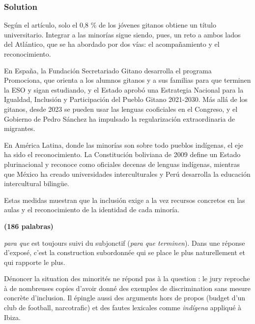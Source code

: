 \documentclass[11pt,a4paper]{article}
\begin{document}
\hypertarget{solution-10}{%
\subsubsection{Solution}\label{solution-10}}

Según el artículo, solo el 0,8 \% de los jóvenes gitanos obtiene un título universitario. Integrar a las minorías sigue siendo, pues, un reto a ambos lados del Atlántico, que se ha abordado por dos vías: el acompañamiento y el reconocimiento.

En España, la Fundación Secretariado Gitano desarrolla el programa Promociona, que orienta a los alumnos gitanos y a sus familias para que terminen la ESO y sigan estudiando, y el Estado aprobó una Estrategia Nacional para la Igualdad, Inclusión y Participación del Pueblo Gitano 2021-2030. Más allá de los gitanos, desde 2023 se pueden usar las lenguas cooficiales en el Congreso, y el Gobierno de Pedro Sánchez ha impulsado la regularización extraordinaria de migrantes.

En América Latina, donde las minorías son sobre todo pueblos indígenas, el eje ha sido el reconocimiento. La Constitución boliviana de 2009 define un Estado plurinacional y reconoce como oficiales decenas de lenguas indígenas, mientras que México ha creado universidades interculturales y Perú desarrolla la educación intercultural bilingüe.

Estas medidas muestran que la inclusión exige a la vez recursos concretos en las aulas y el reconocimiento de la identidad de cada minoría.

\textbf{(186 palabras)}

\begin{methode}

\emph{para que} est toujours suivi du subjonctif (\emph{para que terminen}). Dans une réponse d'exposé, c'est la construction subordonnée qui se place le plus naturellement et qui rapporte le plus.

\end{methode}

\begin{piege}

Dénoncer la situation des minorités ne répond pas à la question : le jury reproche à de nombreuses copies d'avoir donné des exemples de discrimination sans mesure concrète d'inclusion. Il épingle aussi des arguments hors de propos (budget d'un club de football, narcotrafic) et des fautes lexicales comme \emph{indígena} appliqué à Ibiza.

\end{piege}
\end{document}
